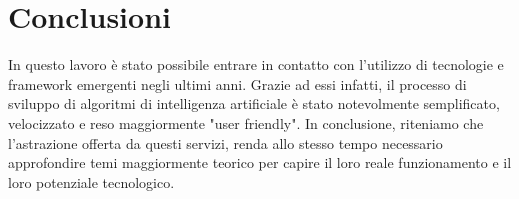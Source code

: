 \section{Conclusioni}
In questo lavoro è stato possibile entrare in contatto con l'utilizzo di tecnologie e framework emergenti negli ultimi anni.
Grazie ad essi infatti, il processo di sviluppo di algoritmi di intelligenza artificiale è stato notevolmente semplificato, velocizzato e reso maggiormente "user friendly".
In conclusione, riteniamo che l'astrazione offerta da questi servizi, renda allo stesso tempo necessario approfondire temi maggiormente teorico per capire il loro reale funzionamento e il loro potenziale tecnologico.
